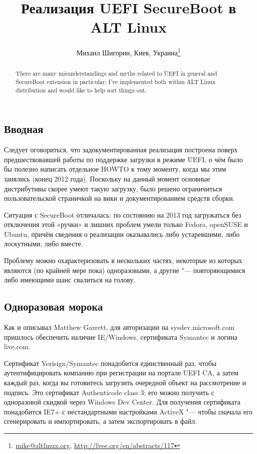 \documentclass[10pt, a5paper]{article}
\begin{document}
\title{Реализация UEFI SecureBoot в ALT Linux}
\author{Михаил Шигорин, Киев, Украина\footnote{\url{mike@altlinux.org}, \url{http://lvee.org/en/abstracts/117}}}
\maketitle
\begin{abstract}
There are many misunderstandings and myths related to UEFI in general and SecureBoot extension in particular; I've implemented both within ALT Linux distribution and would like to help sort things out.
\end{abstract}
\subsection*{Вводная}

Следует оговориться, что задокументированная реализация построена поверх предшествовавшей работы по поддержке загрузки в режиме UEFI, о чём было бы полезно написать отдельное HOWTO к тому моменту, когда мы этим занялись (конец 2012 года).  Поскольку на данный момент основные дистрибутивы скорее умеют такую загрузку, было решено ограничиться пользовательской страничкой на вики и документированием средств сборки.

Ситуация с SecureBoot отличалась: по состоянию на 2013 год загружаться без отключения этой «ручки» и лишних проблем умели только Fedora, openSUSE и Ubuntu, причём сведения о реализации оказывались либо устаревшими, либо лоскутными, либо вместе.

Проблему можно охарактеризовать в нескольких частях, некоторые из которых являются (по крайней мере пока) одноразовыми, а другие "--- повторяющимися либо имеющими шанс свалиться на голову.

\subsection*{Одноразовая морока}

Как и описывал Matthew Garrett, для авторизации на sysdev.mi\-cro\-soft.com пришлось обеспечить наличие IE/Windows, сертификата Symantec и логина live.com.

Сертификат Verisign/Symantec понадобится единственный раз, чтобы аутентифицировать компанию при регистрации на портале UEFI CA, а затем каждый раз, когда вы готовитесь загрузить очередной объект на рассмотрение и подпись. Это сертификат Au\-then\-ti\-code class 3; его можно получить с одноразовой скидкой через Windows Dev Center. Для получения сертификата понадобится IE7+ с нестандартными настройками ActiveX "--- чтобы сначала его сгенерировать и импортировать, а затем экспортировать в файл.
\end{document}
